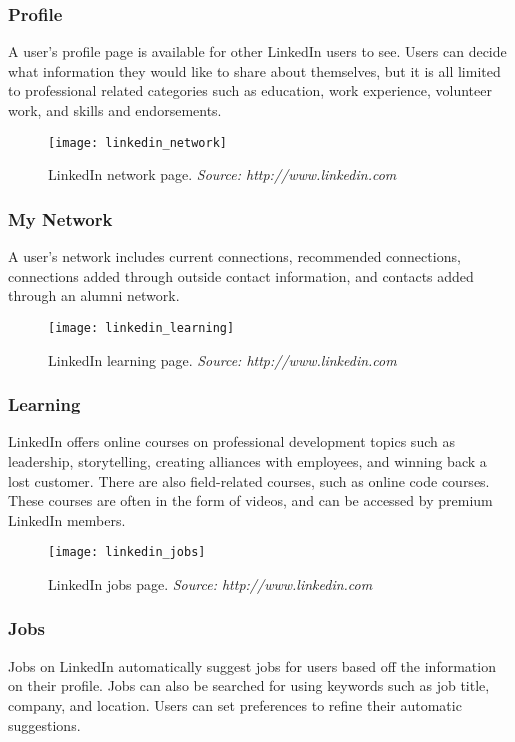 \subsubsection{Profile}
A user's profile page is available for other LinkedIn users to see. Users can decide what information they would like to share about themselves, but it is all limited to professional related categories such as education, work experience, volunteer work, and skills and endorsements. 

\begin{figure}[h]
\centering
\texttt{[image: linkedin\_network]}
\caption{LinkedIn network page. \textit{Source: http://www.linkedin.com}}
\end{figure}
\subsubsection{My Network}
A user's network includes current connections, recommended connections, connections added through outside contact information, and contacts added through an alumni network. 

\begin{figure}[h]
\centering
\texttt{[image: linkedin\_learning]}
\caption{LinkedIn learning page. \textit{Source: http://www.linkedin.com}}
\end{figure}
\subsubsection{Learning}
LinkedIn offers online courses on professional development topics such as leadership, storytelling, creating alliances with employees, and winning back a lost customer. There are also field-related courses, such as online code courses. These courses are often in the form of videos, and can be accessed by premium LinkedIn members. 

\begin{figure}[h]
\centering
\texttt{[image: linkedin\_jobs]}
\caption{LinkedIn jobs page. \textit{Source: http://www.linkedin.com}}
\end{figure}
\subsubsection{Jobs}
Jobs on LinkedIn automatically suggest jobs for users based off the information on their profile. Jobs can also be searched for using keywords such as job title, company, and location. Users can set preferences to refine their automatic suggestions.

